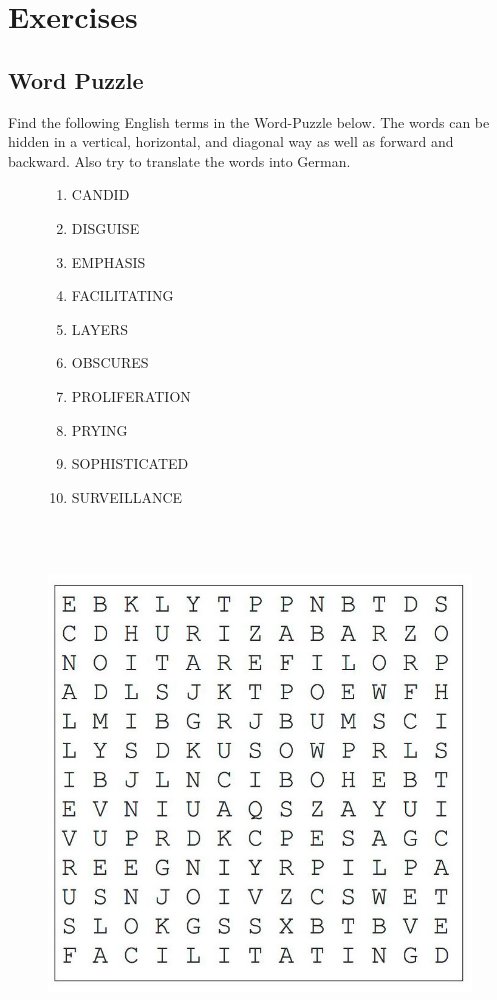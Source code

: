 \documentclass[english, DIV=calc, BCOR=5mm, fontsize=11pt, portrait]{scrartcl}	 %
\begin{document}
\section{Exercises}

\subsection{Word Puzzle}

Find the following English terms in the Word-Puzzle
below. The words can be hidden in a vertical,
horizontal, and diagonal way as well as forward and
backward. Also try to translate the words into
German.
\vspace{0.5cm}
\begin{figure}[H]
	\begin{minipage}{6cm}
		\begin{enumerate}
		\item CANDID 
		\item DISGUISE 
		\item EMPHASIS 
		\item FACILITATING 
		\item LAYERS
		\end{enumerate}
	\end{minipage}
	\begin{minipage}{6cm}
		\begin{enumerate}
		\setcounter{enumi}{5}
		\item OBSCURES
		\item PROLIFERATION
		\item PRYING
		\item SOPHISTICATED
		\item SURVEILLANCE
		\end{enumerate}
	\end{minipage}
	\\ \vspace{0.5cm} \\
	\begin{minipage}{13cm}
		\includegraphics[width=13cm]{./img/Exercise_-_Word_Puzzle_crop.jpg}

\end{minipage}
\end{figure}
\end{document}
